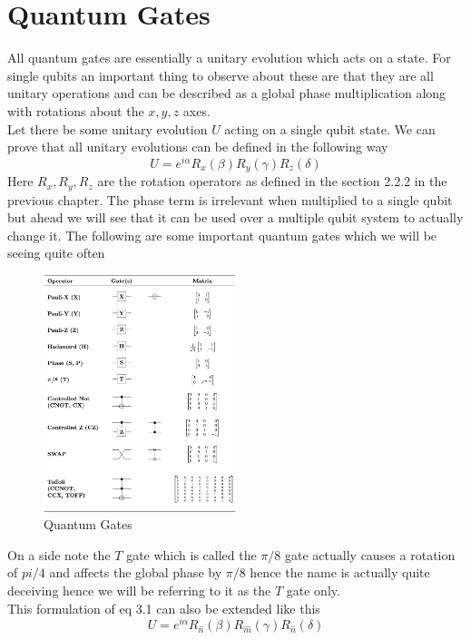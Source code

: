 \documentclass{report}
\begin{document}
\section{Quantum Gates}
All quantum gates are essentially a unitary evolution which acts on a state. For single qubits an important thing to observe about these are that they are all unitary operations and can be described as a global phase multiplication along with rotations about the $x, y, z$ axes.\\
Let there be some unitary evolution $U$ acting on a single qubit state. We can prove that all unitary evolutions can be defined in the following way
\begin{equation}
U = e^{i\alpha}R_x(\beta)R_y(\gamma)R_z(\delta)
\end{equation}
Here $R_x, R_y, R_z$ are the rotation operators as defined in the section 2.2.2 in the previous chapter. The phase term is irrelevant when multiplied to a single qubit but ahead we will see that it can be used over a multiple qubit system to actually change it.
The following are some important quantum gates which we will be seeing quite often\\
\begin{figure}[ht]
    \centering
    \includegraphics[width = 0.5\textwidth]{images/Quantum_Logic_Gates.png}
    \caption{Quantum Gates}
\end{figure}
On a side note the $T$ gate which is called the $\pi/8$ gate actually causes a rotation of $pi/4$ and affects the global phase by $\pi/8$ hence the name is actually quite deceiving hence we will be referring to it as the $T$ gate only.\\
This formulation of eq 3.1 can also be extended like this
\begin{equation}
U = e^{i\alpha}R_{\hat{n}}(\beta)R_{\hat{m}}(\gamma)R_{\hat{n}}(\delta)
\end{equation}
\end{document}
